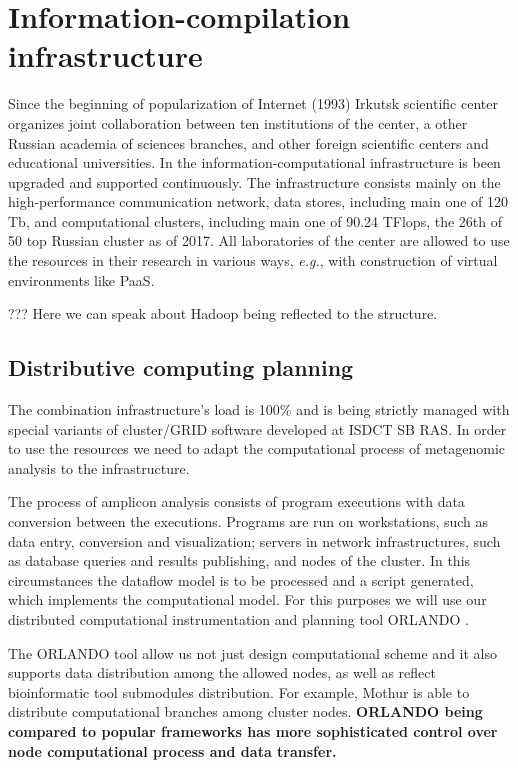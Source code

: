 \documentclass[conference,a4paper]{IEEEtran}
\begin{document}
\section{Information-compilation infrastructure}

Since the beginning of popularization of Internet (1993) Irkutsk scientific center organizes joint collaboration between ten institutions of the center, a other Russian academia of sciences branches, and other foreign scientific centers and educational universities.  In the information-computational infrastructure is been upgraded and supported continuously.  The infrastructure consists mainly on the high-performance communication network, data stores, including main one of 120 Tb, and computational clusters, including main one of 90.24 TFlops, the 26th of 50 top Russian cluster as of 2017.  All laboratories of the center are allowed to use the resources in their research in various ways, \emph{e.g.}, with construction of virtual environments like PaaS.

??? Here we can speak about Hadoop being reflected to the structure.

\subsection{Distributive computing planning}
\label{sec:distr}

The combination infrastructure's load is 100\% and is being strictly managed with special variants of cluster/GRID software developed at ISDCT SB RAS.  In order to use the resources we need to adapt the computational process of metagenomic analysis to the infrastructure.

The process of amplicon analysis consists of program executions with data conversion between the executions.  Programs are run on workstations, such as data entry, conversion and visualization; servers in network infrastructures, such as database queries and results publishing, and nodes of the cluster.  In this circumstances the dataflow model is to be processed and a script generated, which implements the computational model.  For this purposes we will use our distributed computational instrumentation and planning tool ORLANDO \cite{orlando}.

The ORLANDO tool allow us not just design computational scheme and it also supports data distribution among the allowed nodes, as well as reflect bioinformatic tool submodules distribution.  For example, Mothur is able to distribute computational branches among cluster nodes.  \textbf{ORLANDO being compared to popular frameworks has more sophisticated control over node computational process and data transfer.}
\end{document}
